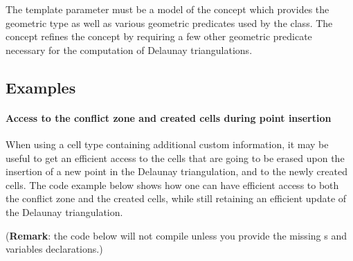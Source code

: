 The template parameter  must be a model of the concept
 which provides the geometric  type as
well as various geometric predicates used by the  class.
The concept  refines the concept
 by requiring a few other geometric predicate necessary
for the computation of Delaunay triangulations.


\subsection{Examples}

\paragraph{Access to the conflict zone and created cells during point
insertion}

When using a cell type containing additional custom information, it may be
useful to get an efficient access to the cells that are going to be erased
upon the insertion of a new point in the Delaunay triangulation, and to the newly
created cells. The code example below shows how one can have efficient
access to both the conflict zone and the created cells, while still
retaining an efficient update of the Delaunay triangulation.

(\textbf{Remark}: the code below will not compile unless you provide the
missing s and variables declarations.)

